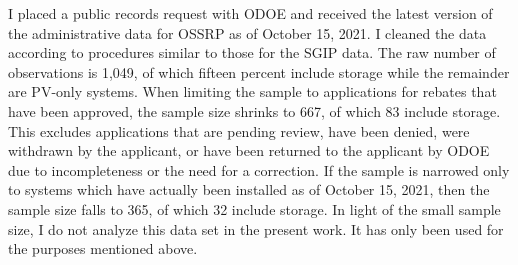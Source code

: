 I placed a public records request with ODOE and received the latest version of the administrative data for OSSRP as of October 15\Xth, 2021. I cleaned the data according to procedures similar to those for the SGIP data. The raw number of observations is 1,049, of which fifteen percent include storage while the remainder are PV-only systems. When limiting the sample to applications for rebates that have been approved, the sample size shrinks to 667, of which 83 include storage. This excludes applications that are pending review, have been denied, were withdrawn by the applicant, or have been returned to the applicant by ODOE due to incompleteness or the need for a correction. If the sample is narrowed only to systems which have actually been installed as of October 15\Xth, 2021, then the sample size falls to 365, of which 32 include storage. In light of the small sample size, I do not analyze this data set in the present work. It has only been used for the purposes mentioned above.